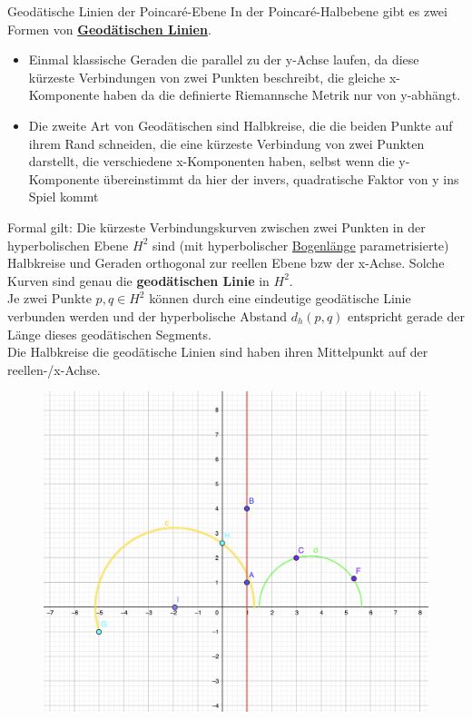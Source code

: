 \begin{titleDef}{Geodätische Linien der Poincaré-Ebene}
\label{geodaetischPoincare}
In der Poincaré-Halbebene gibt es zwei Formen von \hyperref[geodaetischeLinie]{\textbf{Geodätischen Linien}}. 
\begin{itemize}
	\item Einmal klassische Geraden die parallel zu der y-Achse laufen, da diese kürzeste Verbindungen von zwei Punkten beschreibt, die gleiche x-Komponente haben da die definierte Riemannsche Metrik nur von y-abhängt.
	\item Die zweite Art von Geodätischen sind Halbkreise, die die beiden Punkte auf ihrem Rand schneiden, die eine kürzeste Verbindung von zwei Punkten darstellt, die verschiedene x-Komponenten haben, selbst wenn die y-Komponente übereinstimmt da hier der invers, quadratische Faktor von y ins Spiel kommt
\end{itemize}
Formal gilt: Die kürzeste Verbindungskurven zwischen zwei Punkten in der hyperbolischen Ebene $H^2$ sind (mit hyperbolischer \hyperref[bogenlaenge]{Bogenlänge} parametrisierte) Halbkreise und Geraden orthogonal zur reellen Ebene bzw der x-Achse. Solche Kurven sind genau die \textbf{geodätischen Linie} in $H^2$.\\
Je zwei Punkte $p,q\in H^2$ können durch eine eindeutige geodätische Linie verbunden werden und der hyperbolische Abstand $d_h(p,q)$ entspricht gerade der Länge dieses geodätischen Segments. \\
Die Halbkreise die geodätische Linien sind haben ihren Mittelpunkt auf der reellen-/x-Achse.
\begin{figure}[h]
	\centering
	\includegraphics[width=\linewidth]{Bilder/GeodaetischeHyperebene}
	\label{geodaetischeHyperGrafik}
\end{figure}
\end{titleDef}

